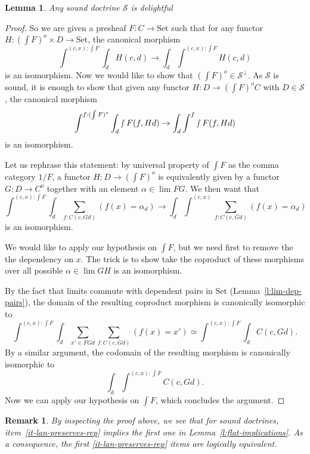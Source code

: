 \documentclass{article}
\newcommand{\Set}{\text{Set}}
\newtheorem{remark}[theorem]{Remark}
\newtheorem{lemma}[theorem]{Lemma}
\begin{document}
\begin{lemma}
  \label{l:sound-delightful}
  Any sound doctrine $\mathcal{S}$ is delightful~\cite[Theorem 2.4]{lack_accessible}
\end{lemma}
\begin{proof}
  So we are given a presheaf $F:C\rightarrow \Set$ such that 
  for any functor
  $H:(\int F)^o \times D \rightarrow \Set$, the 
  canonical morphism
  \[
    \int^{(c,x): \int F} \int_d H(c,d) \rightarrow
    \int_d \int^{(c,x): \int F}  H(c,d) 
  \]
  is an isomorphism.
  Now we would like to show that $(\int F)^o \in \mathcal{S}^\bot$. As
  $\mathcal{S}$ is sound, it is enough to show that given any functor
  $H:D \rightarrow (\int F)^oC $ with $D \in \mathcal{S}$, the 
  canonical morphism
  \[
    \int^{f: (\int F)^o} \int_d \smallint F (f, H d) \rightarrow
    \int_d \int^{f}  \smallint F(f, H d) 
  \]
  is an isomorphism.
  
  Let us rephrase this statement: by universal property
of $\int F$ as the comma category $1/F$,
  a functor 
  $H:D \rightarrow (\int F)^o $ is equivalently given by a functor
  $G : D \rightarrow C^o$ together with an element $\alpha \in \lim FG$.
  We then want that
  \[
    \int^{(c,x): \int F} \int_d  \sum_{f : C(c,G d)} (f(x)=\alpha_d) \rightarrow
    \int_d \int^{(c,x)}  \sum_{f : C(c,G d)} (f(x)=\alpha_d) 
  \]
  is an isomorphism.

  We would like to apply our hypothesis on $\int F$, but we need first to remove the
  the dependency on $x$. The trick is to show take the coproduct of these
  morphisms over all possible $\alpha\in \lim GH$ is an isomorphism.

  By the fact that limits commute with dependent pairs in $\Set$
  (Lemma~\ref{l:lim-dep-pairs}),
  the domain of the resulting coproduct morphism is canonically isomorphic to
\[
  \int^{(c,x): \int F} \int_d  \sum_{x' \in FGd}\sum_{f : C(c,G d)} (f(x)=x')
  \simeq
  \int^{(c,x): \int F} \int_d  C(c,G d).
  \]
  By a similar argument, the codomain of the resulting morphism is canonically
  isomorphic to
  \[
    \int_d \int^{(c,x): \int F}   C(c,G d).
  \]
Now we can apply our hypothesis on $\int F$, which concludes the argument.

  
\end{proof}
\begin{remark}
  By inspecting the proof above, we see that for sound doctrines,
  item~\ref{it-lan-preserves-rep} implies the first one in
  Lemma~\ref{l:flat-implications}. 
  As a consequence, the first \ref{it-lan-preserves-rep} items
  are logically equivalent.
\end{remark}
\end{document}
